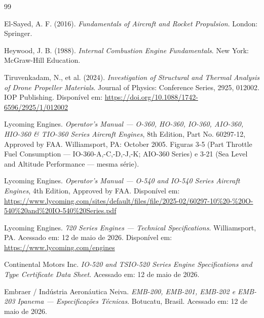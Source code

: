\documentclass[a4paper,12pt]{article}
\begin{document}
\newpage

\begin{thebibliography}{99}

    El-Sayed, A. F. (2016). \textit{Fundamentals of Aircraft and Rocket Propulsion}. London: Springer.

    Heywood, J. B. (1988). \textit{Internal Combustion Engine Fundamentals}. New York: McGraw-Hill Education.

    Tiruvenkadam, N., et al. (2024). \textit{Investigation of Structural and Thermal Analysis of Drone Propeller Materials}. Journal of Physics: Conference Series, 2925, 012002. IOP Publishing. Disponível em: \url{https://doi.org/10.1088/1742-6596/2925/1/012002}


    Lycoming Engines. \textit{Operator's Manual --- O-360, HO-360, IO-360, AIO-360, HIO-360 \& TIO-360 Series Aircraft Engines}, 8th Edition, Part No. 60297-12, Approved by FAA. Williamsport, PA: October 2005. Figuras 3-5 (Part Throttle Fuel Consumption --- IO-360-A,-C,-D,-J,-K; AIO-360 Series) e 3-21 (Sea Level and Altitude Performance --- mesma série).

    Lycoming Engines. \textit{Operator's Manual --- O-540 and IO-540 Series Aircraft Engines}, 4th Edition, Approved by FAA. Disponível em: \url{https://www.lycoming.com/sites/default/files/file/2025-02/60297-10\%20-\%20O-540\%20and\%20IO-540\%20Series.pdf}

    Lycoming Engines. \textit{720 Series Engines --- Technical Specifications}. Williamsport, PA. Acessado em: 12 de maio de 2026. Disponível em: \url{https://www.lycoming.com/engines}

    Continental Motors Inc. \textit{IO-520 and TSIO-520 Series Engine Specifications and Type Certificate Data Sheet}. Acessado em: 12 de maio de 2026.


    Embraer / Indústria Aeronáutica Neiva. \textit{EMB-200, EMB-201, EMB-202 e EMB-203 Ipanema --- Especificações Técnicas}. Botucatu, Brasil. Acessado em: 12 de maio de 2026.


\end{thebibliography}
\end{document}

